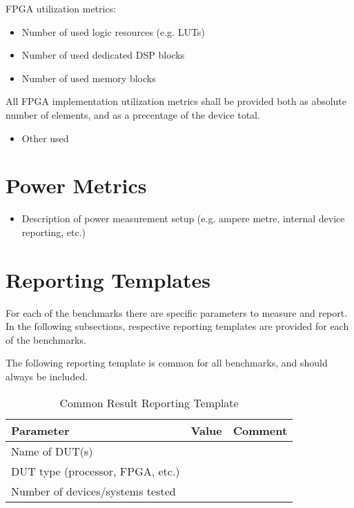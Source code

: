 FPGA utilization metrics:
\begin{itemize}
    \item Number of used logic resources (e.g. LUTs)
    \item Number of used dedicated DSP blocks
    \item Number of used memory blocks
\end{itemize}

All FPGA implementation utilization metrics shall be provided both as absolute number of elements, and as a precentage of the device total.

\begin{itemize}
    \item Other used 
\end{itemize}

\section{Power Metrics}

\begin{itemize}
    \item Description of power measurement setup (e.g. ampere metre, internal device reporting, etc.) 
\end{itemize}

\newpage
\section{Reporting Templates}
For each of the benchmarks there are specific parameters to measure and report. In the following subsections, respective reporting templates are provided for each of the benchmarks. 

The following reporting template is common for all benchmarks, and should always be included. 

\begin{table}[!h]
    \centering
    \begin{tabular}{|l|l|l|}
        \hline
        Parameter                           & Value  & Comment \\ \hline
        \hline
        Name of DUT(s)                      &  & \\ \hline
        DUT type (processor, FPGA, etc.)    &  & \\ \hline
        Number of devices/systems tested    &  & \\ \hline
    \end{tabular}
    \caption{Common Result Reporting Template}
    \label{tab:common_report_template}
\end{table}

